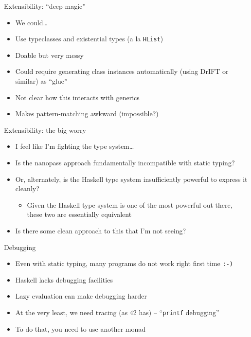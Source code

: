 \documentclass[adam,pdf,slideColor]{prosper}
\begin{document}
\begin{slide}{Extensibility: ``deep magic''}
\begin{itemize}
\item We could\ldots
\item Use typeclasses and existential types (a la \verb|HList|)
\item Doable but very messy
\item Could require generating class instances automatically (using
  DrIFT or similar) as ``glue''
\item Not clear how this interacts with generics
\item Makes pattern-matching awkward (impossible?)
\end{itemize}
\end{slide}

\begin{slide}{Extensibility: the big worry}
\begin{itemize}
\item I feel like I'm fighting the type system\ldots
\item Is the nanopass approach fundamentally incompatible with static
  typing?
\item Or, alternately, is the Haskell type system insufficiently
  powerful to express it cleanly?
\begin{itemize}
\item Given the Haskell type system is one of the most powerful out
  there, these two are essentially equivalent
\end{itemize}
\item Is there some clean approach to this that I'm not seeing?
\end{itemize}
\end{slide}

\begin{slide}{Debugging}
\begin{itemize}
\item Even with static typing, many programs do not work right first
  time \verb|:-)|
\item Haskell lacks debugging facilities
\item Lazy evaluation can make debugging harder
\item At the very least, we need tracing (as 42 has) -- ``\verb|printf|
  debugging''
\item To do that, you need to use another monad
\end{itemize}
\end{slide}
\end{document}
